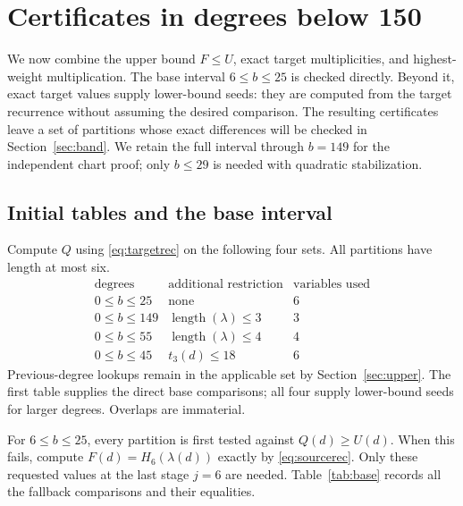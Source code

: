 \section{Certificates in degrees below 150}\label{sec:certificates}

We now combine the upper bound \(F\le U\), exact target multiplicities,
and highest-weight multiplication. The base interval \(6\le b\le25\)
is checked directly. Beyond it, exact target values supply lower-bound
seeds: they are computed from the target recurrence without assuming
the desired comparison. The resulting certificates leave a set of
partitions whose exact differences will be checked in
Section~\ref{sec:band}. We retain the full interval through \(b=149\)
for the independent chart proof; only \(b\le29\) is needed with
quadratic stabilization.

\subsection{Initial tables and the base interval}
Compute \(Q\) using \eqref{eq:targetrec} on the following four sets.
All partitions have length at most six.
\begin{equation}\label{eq:tables}
\begin{array}{c|l|c}
\text{degrees}&\text{additional restriction}&\text{variables used}\\ \hline
0\le b\le25&\text{none}&6\\
0\le b\le149&\operatorname{length}(\lambda)\le3&3\\
0\le b\le55&\operatorname{length}(\lambda)\le4&4\\
0\le b\le45&t_3(d)\le18&6
\end{array}
\end{equation}
Previous-degree lookups remain in the applicable set by
Section~\ref{sec:upper}. The first table supplies the direct base
comparisons; all four supply lower-bound seeds for larger degrees.
Overlaps are immaterial.

For \(6\le b\le25\), every partition is first tested against \(Q(d)\ge
U(d)\). When this fails, compute \(F(d)=H_6(\lambda(d))\) exactly by
\eqref{eq:sourcerec}. Only these requested values at the last stage
\(j=6\) are needed. Table~\ref{tab:base} records all the fallback
comparisons and their equalities.

